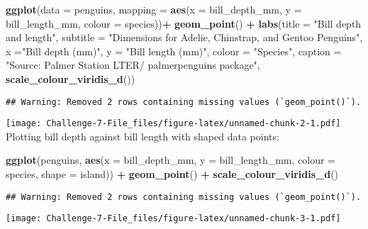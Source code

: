 \documentclass[
]{article}
\newenvironment{Shaded}{\begin{snugshade}}{\end{snugshade}}
\newcommand{\AttributeTok}[1]{\textcolor[rgb]{0.13,0.29,0.53}{#1}}
\newcommand{\FunctionTok}[1]{\textcolor[rgb]{0.13,0.29,0.53}{\textbf{#1}}}
\newcommand{\NormalTok}[1]{#1}
\newcommand{\SpecialCharTok}[1]{\textcolor[rgb]{0.81,0.36,0.00}{\textbf{#1}}}
\newcommand{\StringTok}[1]{\textcolor[rgb]{0.31,0.60,0.02}{#1}}
\begin{document}
\begin{Shaded}
\begin{Highlighting}[]
\FunctionTok{ggplot}\NormalTok{(}\AttributeTok{data =}\NormalTok{ penguins,}
       \AttributeTok{mapping =} \FunctionTok{aes}\NormalTok{(}\AttributeTok{x =}\NormalTok{ bill\_depth\_mm,}
                     \AttributeTok{y =}\NormalTok{ bill\_length\_mm,}
                     \AttributeTok{colour =}\NormalTok{ species))}\SpecialCharTok{+}
  \FunctionTok{geom\_point}\NormalTok{() }\SpecialCharTok{+}
  \FunctionTok{labs}\NormalTok{(}\AttributeTok{title =} \StringTok{"Bill depth and length"}\NormalTok{, }
       \AttributeTok{subtitle =} \StringTok{"Dimensions for Adelie, Chinstrap, and Gentoo Penguins"}\NormalTok{,}
       \AttributeTok{x =}\StringTok{"Bill depth (mm)"}\NormalTok{, }
       \AttributeTok{y =} \StringTok{"Bill length (mm)"}\NormalTok{,}
       \AttributeTok{colour =} \StringTok{"Species"}\NormalTok{,}
       \AttributeTok{caption =} \StringTok{"Source: Palmer Station LTER/ palmerpenguins package"}\NormalTok{,}
\FunctionTok{scale\_colour\_viridis\_d}\NormalTok{())}
\end{Highlighting}
\end{Shaded}

\begin{verbatim}
## Warning: Removed 2 rows containing missing values (`geom_point()`).
\end{verbatim}

\texttt{[image: Challenge-7-File\_files/figure-latex/unnamed-chunk-2-1.pdf]}
Plotting bill depth against bill length with shaped data points:

\begin{Shaded}
\begin{Highlighting}[]
\FunctionTok{ggplot}\NormalTok{(penguins, }\FunctionTok{aes}\NormalTok{(}\AttributeTok{x =}\NormalTok{ bill\_depth\_mm, }\AttributeTok{y =}\NormalTok{ bill\_length\_mm, }\AttributeTok{colour =}\NormalTok{ species,}
\AttributeTok{shape =}\NormalTok{ island)) }\SpecialCharTok{+}
\FunctionTok{geom\_point}\NormalTok{() }\SpecialCharTok{+} \FunctionTok{scale\_colour\_viridis\_d}\NormalTok{()}
\end{Highlighting}
\end{Shaded}

\begin{verbatim}
## Warning: Removed 2 rows containing missing values (`geom_point()`).
\end{verbatim}

\texttt{[image: Challenge-7-File\_files/figure-latex/unnamed-chunk-3-1.pdf]}
\end{document}
